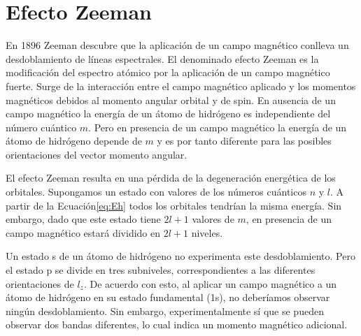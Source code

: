 
\section{Efecto Zeeman}
En 1896 Zeeman descubre que la aplicación de un campo magnético conlleva un
desdoblamiento de líneas espectrales. El denominado efecto Zeeman es la 
modificación del espectro atómico por la aplicación de un campo magnético
fuerte. Surge de la interacción entre el campo magnético aplicado y los
momentos magnéticos debidos al momento angular orbital y de spin. 
En ausencia de un campo magnético la energía de un átomo de hidrógeno es
independiente del número cuántico $m$. Pero en presencia de un campo magnético
la energía de un átomo de hidrógeno depende de $m$ y es por tanto diferente 
para las posibles orientaciones del vector momento angular. 

El efecto Zeeman resulta en una pérdida de la degeneración energética
de los orbitales. Supongamos un estado con valores de los números 
cuánticos $n$  y $l$. A partir de la Ecuación\ref{eq:Eh} todos los
orbitales tendrían la misma energía. Sin embargo, dado que este estado
tiene $2l+1$ valores de $m$, en presencia de un campo magnético estará 
dividido en $2l+1$ niveles. 

Un estado s de un átomo de hidrógeno no experimenta este desdoblamiento.
Pero el estado p se divide en tres subniveles, correspondientes
a las diferentes orientaciones de $l_z$. De acuerdo con esto, al aplicar 
un campo magnético a un átomo de hidrógeno en su estado fundamental (1s), 
no deberíamos observar ningún desdoblamiento. Sin embargo, experimentalmente
sí que se pueden observar dos bandas diferentes, lo cual indica un momento
magnético adicional.

